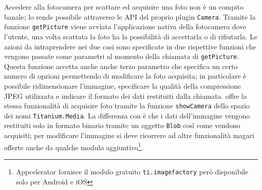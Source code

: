             Accedere alla fotocamera per scattare ed acquisire una foto non è un
            compito banale; \pg{} lo rende possibile attraverso le API del
            proprio plugin \texttt{Camera}. Tramite la funzione
            \texttt{getPicture} viene avviata l'applicazione nativa della
            fotocamera dove l'utente, una volta scattata la foto ha la
            possibilità di accettarla o di rifiutarla. Le azioni da
            intraprendere nei due casi sono specificate in due rispettive
            funzioni \js{} che vengono passate come parametri al momento della
            chiamata di \texttt{getPicture}. Questa funzione accetta anche
            anche terzo parametro che specifica un certo numero di opzioni
            permettendo di modificare la foto acquisita; in particolare è
            possibile ridimensionare l'immagine, specificare la qualità della
            compressione JPEG utilizzata e indicare il formato dei dati
            restituiti dalla chiamata. \tisdk{} offre la stessa funzionalità di
            acquisire foto tramite la funzione \texttt{showCamera} dello spazio
            dei nomi \texttt{Titanium.Media}. La differenza con \pg{} è che i
            dati dell'immagine vengono restituiti solo in formato binario
            tramite un oggetto \js{} \texttt{Blob} così come vendono acquisiti;
            per modificare l'immagine si deve ricorrere ad altre funzionalità
            magari offerte anche da qualche modulo aggiuntivo\footnote{Appcelerator
            fornisce il modulo gratuito \texttt{ti.imagefactory} però
            disponibile solo per Android e iOS}.

